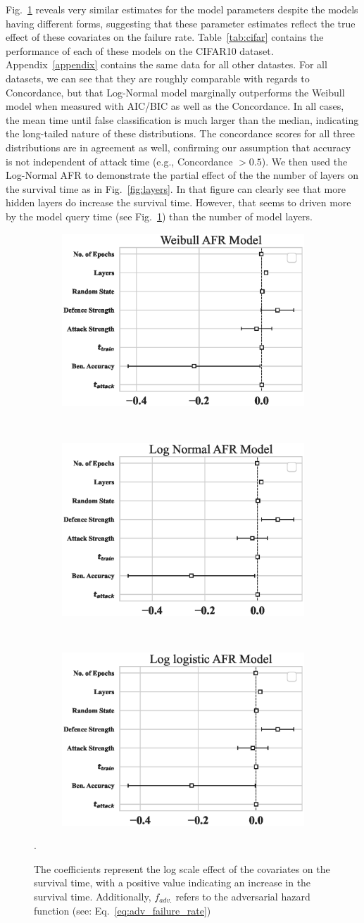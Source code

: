 Fig.~\ref{fig:afr_models} reveals very similar estimates for the model parameters despite the models having different forms, suggesting that these parameter estimates reflect the true effect of these covariates on the failure rate. Table~\ref{tab:cifar} contains the performance of each of these models on the CIFAR10 dataset.  Appendix~\ref{appendix} contains the same data for all other datastes. For all datasets, we can see that they are roughly comparable with regards to Concordance, but that Log-Normal model marginally outperforms the Weibull model when measured with AIC/BIC as well as the Concordance.
In all cases, the mean time until false classification is much larger than the median, indicating the long-tailed nature of these distributions.
The concordance scores for all three distributions are in agreement as well, confirming our assumption that accuracy is not independent of attack time (e.g., Concordance $> 0.5$).
We then used the Log-Normal AFR to demonstrate the partial effect of the the number of layers on the survival time as in Fig.~\ref{fig:layers}. In that figure can clearly see that more hidden layers do increase the survival time. However, that seems to driven more by the model query time (see Fig.~\ref{fig:afr_models}) than the number of model layers.
\begin{figure}
	\begin{subfigure}
		\centering
		\includegraphics[width=.32\textwidth]{cifar100/weibull_aft.eps}
	\end{subfigure}%
	~
	\begin{subfigure}
		\centering
		\includegraphics[width=.32\textwidth]{cifar100/log_normal_aft.eps}
	\end{subfigure}
	~
	\begin{subfigure}
		\centering
		\includegraphics[width=.32\textwidth]{cifar100/log_logistic_aft.eps}
	\end{subfigure}
	\caption{ The coefficients represent the log scale effect of the covariates on the survival time, with a positive value indicating an increase in the survival time. Additionally, $f_{adv.}$ refers to the adversarial hazard function (see: Eq.~\ref{eq:adv_failure_rate})}.
	\label{fig:afr_models}
\end{figure}
